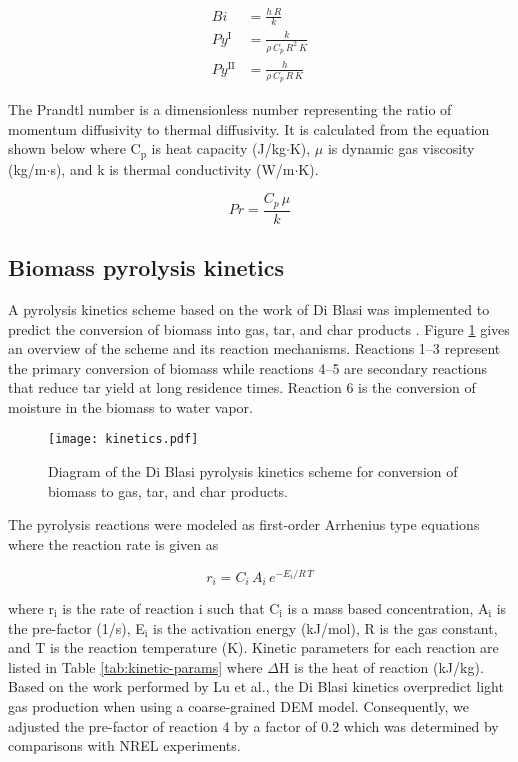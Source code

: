 \begin{align}
    Bi &= \frac{h\,R}{k} \label{eq:biot} \\
    Py^{\textrm{I}} &= \frac{k}{\rho\,C_p\,R^2\,K} \label{eq:pynumber1} \\
    Py^{\textrm{II}} &= \frac{h}{\rho\,C_p\,R\,K} \label{eq:pynumber2}
\end{align}

The Prandtl number is a dimensionless number representing the ratio of momentum diffusivity to thermal diffusivity. It is calculated from the equation shown below where C$_\text{p}$ is heat capacity (J/kg$\cdot$K), $\mu$ is dynamic gas viscosity (kg/m$\cdot$s), and k is thermal conductivity (W/m$\cdot$K).

\begin{equation}
    Pr = \frac{C_p\, \mu}{k}
\end{equation}


\subsection{Biomass pyrolysis kinetics}

A pyrolysis kinetics scheme based on the work of Di Blasi was implemented to predict the conversion of biomass into gas, tar, and char products \cite{Blasi-1993,Blasi-2001}. Figure \ref{fig:blasi} gives an overview of the scheme and its reaction mechanisms. Reactions 1--3 represent the primary conversion of biomass while reactions 4--5 are secondary reactions that reduce tar yield at long residence times. Reaction 6 is the conversion of moisture in the biomass to water vapor.

\begin{figure}[H]
    \centering
    \texttt{[image: kinetics.pdf]}
    \caption{Diagram of the Di Blasi pyrolysis kinetics scheme for conversion of biomass to gas, tar, and char products.}
    \label{fig:blasi}
\end{figure}

The pyrolysis reactions were modeled as first-order Arrhenius type equations where the reaction rate is given as

\begin{equation}
    r_i = C_i\,A_i\,e^{-E_i / R\,T}
\end{equation}

\noindent where r$_\text{i}$ is the rate of reaction i such that C$_\text{i}$ is a mass based concentration, A$_\text{i}$ is the pre-factor (1/s), E$_\text{i}$ is the activation energy (kJ/mol), R is the gas constant, and T is the reaction temperature (K). Kinetic parameters for each reaction are listed in Table \ref{tab:kinetic-params} where $\Delta$H is the heat of reaction (kJ/kg). Based on the work performed by Lu et al.\cite{lu2020bridging}, the Di Blasi kinetics overpredict light gas production when using a coarse-grained DEM model. Consequently, we adjusted the pre-factor of reaction 4 by a factor of 0.2 which was determined by comparisons with NREL experiments.


